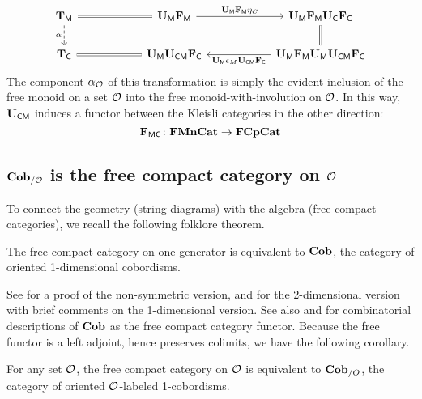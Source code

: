 \documentclass[11pt,oneside,article]{memoir}
\begin{document}
\begin{equation*}
	\begin{tikzcd}[column sep=2cm]
		\TM\ar[r,equal]\ar[d,dashed,"\alpha"']&\UM\FM\ar[r,"\UM\FM\eta_C"]&\UM\FM\UC\FC\ar[d,equal]\\
		\TC&\UM\UCM\FC\ar[l,equal]&\UM\FM\UM\UCM\FC\ar[l,"\UM\epsilon_M\UCM\FC"]
	\end{tikzcd}
\end{equation*}
The component $\alpha_{\mathcal{O}}$ of this transformation is simply the evident inclusion of the free
monoid on a set $\mathcal{O}$ into the free monoid-with-involution on $\mathcal{O}$. In this way, $\mathbf{U}_{\mathsf{CM}}$
induces a functor between the Kleisli categories in the other direction:
\begin{equation}\label{eqn:FMC}
   \mathbf{F}_{\mathsf{MC}}\colon\mathbf{FMnCat}\to\mathbf{FCpCat}
\end{equation}


\subsection{$\mathbf{Cob}_{/\mathcal{O}}$ is the free compact category on $\mathcal{O}$}

To connect the geometry (string diagrams) with the algebra (free compact categories), we recall the
following folklore theorem.

\begin{theorem}
The free compact category on one generator is equivalent to $\mathbf{Cob}$, the category of oriented
1-dimensional cobordisms.
\end{theorem}

See \cite[Theorem 3.6]{FreydYetter} for a proof of the non-symmetric version, \cite{Kock} and
\cite{BaezDolan} for the 2-dimensional version with brief comments on the 1-dimensional version. See
also \cite{KellyLaplaza} and \cite{Abramsky2} for combinatorial descriptions of $\mathbf{Cob}$ as the free
compact category functor.  Because the free functor is a left adjoint, hence preserves colimits, we
have the following corollary.

\begin{corollary}\label{cor:free_compact_is_Cob}
   For any set $\mathcal{O}$, the free compact category on $\mathcal{O}$ is equivalent to $\mathbf{Cob}_{/O}$, the
   category of oriented $\mathcal{O}$-labeled 1-cobordisms.
\end{corollary}

\end{document}
